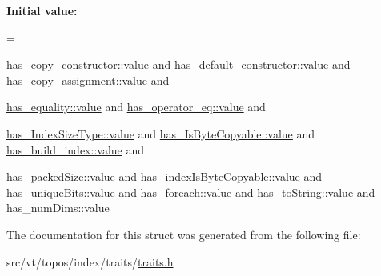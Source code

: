 {\bfseries Initial value\+:}
\begin{DoxyCode}
=
    
    \hyperlink{structdetection_1_1detector_a6d7d0e1bdf5903db9edbe448edccf83b}{has\_copy\_constructor::value}    and
    \hyperlink{structdetection_1_1detector_a6d7d0e1bdf5903db9edbe448edccf83b}{has\_default\_constructor::value} and
    has\_copy\_assignment::value     and
    
    \hyperlink{structdetection_1_1detector_a6d7d0e1bdf5903db9edbe448edccf83b}{has\_equality::value}            and
    \hyperlink{structdetection_1_1detector_a6d7d0e1bdf5903db9edbe448edccf83b}{has\_operator\_eq::value}         and
    
    \hyperlink{structdetection_1_1detector_a6d7d0e1bdf5903db9edbe448edccf83b}{has\_IndexSizeType::value}       and
    \hyperlink{structdetection_1_1detector_a6d7d0e1bdf5903db9edbe448edccf83b}{has\_IsByteCopyable::value}      and
    \hyperlink{structdetection_1_1detector_a6d7d0e1bdf5903db9edbe448edccf83b}{has\_build\_index::value}         and
    
    has\_packedSize::value          and
    \hyperlink{structdetection_1_1detector_a6d7d0e1bdf5903db9edbe448edccf83b}{has\_indexIsByteCopyable::value} and
    has\_uniqueBits::value          and
    \hyperlink{structdetection_1_1detector_a6d7d0e1bdf5903db9edbe448edccf83b}{has\_foreach::value}             and
    has\_toString::value            and
    has\_numDims::value
\end{DoxyCode}


The documentation for this struct was generated from the following file\+:\begin{DoxyCompactItemize}
\item 
src/vt/topos/index/traits/\hyperlink{traits_8h}{traits.\+h}\end{DoxyCompactItemize}
